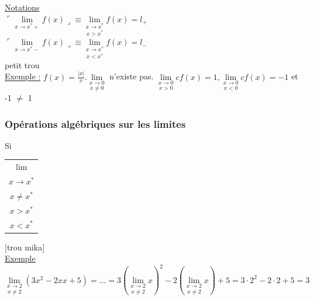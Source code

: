 \documentclass[12pt,a4paper]{article}
\newcommand{\limite}{\lim\limits_}
\begin{document}
{\underline{Notations}\\
$\ulcorner \limite{x\to x^*+} f(x)\lrcorner \equiv \underset{x > x^*}{\limite{x\to x^*}} f(x) = l_+$\\
$\ulcorner \limite{x\to x^*-} f(x)\lrcorner \equiv \underset{x < x^*}{\limite{x\to x^*}} f(x) = l_-$\\
petit trou\\
\underline{Exemple :} $f(x) = \frac{|x|}{x}. \underset{x\neq 0}{\limite{x \to 0}}$ n'existe pas. $\underset{x > 0}{\limite{x \to 0}}cf(x) = 1, \underset{x < 0}{\limite{x \to 0}}cf(x) = -1$ et -1 $\neq$ 1
\subsubsection{Opérations algébriques sur les limites}
Si\begin{tabular}{c}
$\lim$ \\ 
$x \to x^*$ \\ 
$x \neq x^*$ \\ 
$x > x^*$ \\ 
$x < x^*$ \\ 
\end{tabular} 

[trou mika]\\
\underline{Exemple} $\underset{x \neq 2}{\limite{x \to 2}} (3x^2 -2xx +5) = ... = 3 (\underset{x \neq 2}{\limite{x \to 2}}x)^2 - 2(\underset{x \neq 2}{\limite{x \to 2}}x) + 5 = 3\cdot 2^2 - 2 \cdot 2 + 5 = 3$

}
\end{document}
